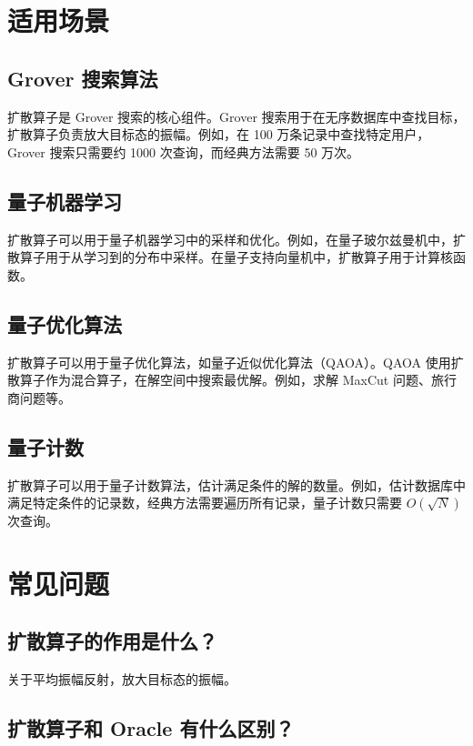 \documentclass[12pt,a4paper]{article}
\begin{document}
\section{适用场景}

\subsection{Grover 搜索算法}

扩散算子是 Grover 搜索的核心组件。Grover 搜索用于在无序数据库中查找目标，扩散算子负责放大目标态的振幅。例如，在 100 万条记录中查找特定用户，Grover 搜索只需要约 1000 次查询，而经典方法需要 50 万次。

\subsection{量子机器学习}

扩散算子可以用于量子机器学习中的采样和优化。例如，在量子玻尔兹曼机中，扩散算子用于从学习到的分布中采样。在量子支持向量机中，扩散算子用于计算核函数。

\subsection{量子优化算法}

扩散算子可以用于量子优化算法，如量子近似优化算法（QAOA）。QAOA 使用扩散算子作为混合算子，在解空间中搜索最优解。例如，求解 MaxCut 问题、旅行商问题等。

\subsection{量子计数}

扩散算子可以用于量子计数算法，估计满足条件的解的数量。例如，估计数据库中满足特定条件的记录数，经典方法需要遍历所有记录，量子计数只需要 $O(\sqrt{N})$ 次查询。

\section{常见问题}

\subsection{扩散算子的作用是什么？}

关于平均振幅反射，放大目标态的振幅。

\subsection{扩散算子和 Oracle 有什么区别？}
\end{document}
